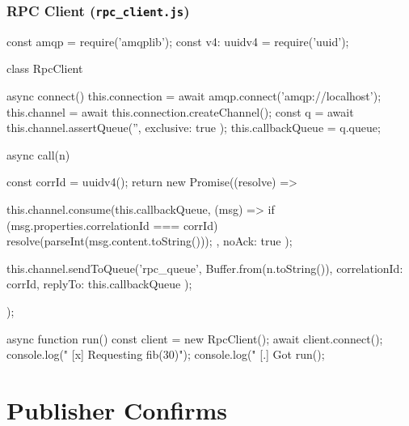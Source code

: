 \documentclass[11pt,a4paper]{article}
\begin{document}
\subsubsection*{RPC Client (\texttt{rpc\_client.js})}
\begin{js}[basicstyle=\ttfamily\scriptsize]
const amqp = require('amqplib');
const { v4: uuidv4 } = require('uuid');

class RpcClient {
    async connect() {
        this.connection = await amqp.connect('amqp://localhost');
        this.channel = await this.connection.createChannel();
        const q = await this.channel.assertQueue('', { exclusive: true });
        this.callbackQueue = q.queue;
    }

    async call(n) {
        const corrId = uuidv4();
        return new Promise((resolve) => {
            this.channel.consume(this.callbackQueue, (msg) => {
                if (msg.properties.correlationId === corrId) {
                    resolve(parseInt(msg.content.toString()));
                }
            }, { noAck: true });

            this.channel.sendToQueue('rpc_queue', Buffer.from(n.toString()), {
                correlationId: corrId,
                replyTo: this.callbackQueue
            });
        });
    }
}

async function run() {
    const client = new RpcClient();
    await client.connect();
    console.log(" [x] Requesting fib(30)");
    console.log(" [.] Got %
}
run();
\end{js}

\newpage
\section{Publisher Confirms}



\end{document}
